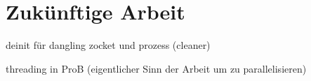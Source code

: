 

\section{Zukünftige Arbeit}


 deinit für dangling zocket und prozess (cleaner)

 threading in ProB (eigentlicher Sinn der Arbeit um zu parallelisieren)
